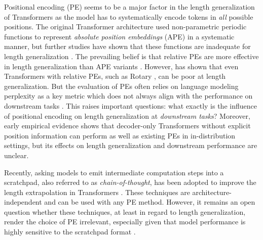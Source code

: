 \documentclass{article}
\begin{document}
Positional encoding (PE) seems to be a major factor in the length generalization of Transformers as the model has to systematically encode tokens in \emph{all} possible positions.
The original Transformer architecture \citep{Vaswani2017:Transformer} used non-parametric periodic functions to represent \emph{absolute position embeddings} (APE) in a systematic manner, but further studies have shown that these functions are inadequate for length generalization \citep{Ontanon2022:MakeTransformerCompositional}.
The prevailing belief is that relative PEs \citep{Shaw2018:RelativePosEnc,Raffel2020:T5} are more effective in length generalization
than APE variants \citep{Ontanon2022:MakeTransformerCompositional,Csordas2021:DevilInDetail}.
However, \cite{Press2022:ALiBi} has shown that even Transformers with relative PEs, such as Rotary \citep{Su2021:Rotary}, can be poor at length generalization.
But the evaluation of PEs often relies on language modeling perplexity as a key metric \citep{Haviv2022:NoPETransformer,Press2022:ALiBi} which does not always align with the performance on downstream tasks  \citep{Tay2022:PerplexityDontTransfer}.
This raises important questions: what exactly is the influence of positional encoding on length generalization at \emph{downstream tasks}? 
Moreover, early empirical evidence shows that decoder-only Transformers without explicit position information \citep{Tsai2019:TransformerDissection,Haviv2022:NoPETransformer} can perform as well as existing PEs in in-distribution settings, but its effects on  length generalization and downstream performance are unclear. 



Recently, asking models to emit intermediate computation steps into a scratchpad, also referred to as \emph{chain-of-thought}, has been adopted to improve the length extrapolation in Transformers \citep{Nye2021:Scratchpad,Wei2022:ChainOfThought}.
These techniques are architecture-independent and can be used with any PE method.
However, it remains an open question whether these techniques, at least in regard to length generalization, render the choice of PE irrelevant,
especially given that model performance is highly sensitive to the scratchpad format \citep{Bueno2022:MarkupTokens,Akyurek2022:GPT3AdditionScratchpadFormat}.
\end{document}
